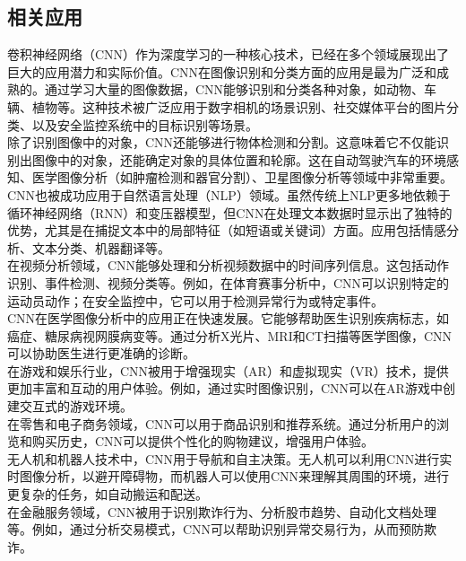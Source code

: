 \documentclass{NauThesis}
\begin{document}
\subsection{相关应用}
卷积神经网络（CNN）作为深度学习的一种核心技术，已经在多个领域展现出了巨大的应用潜力和实际价值。CNN在图像识别和分类方面的应用是最为广泛和成熟的。通过学习大量的图像数据，CNN能够识别和分类各种对象，如动物、车辆、植物等。这种技术被广泛应用于数字相机的场景识别、社交媒体平台的图片分类、以及安全监控系统中的目标识别等场景。
\\\hspace*{2em}除了识别图像中的对象，CNN还能够进行物体检测和分割。这意味着它不仅能识别出图像中的对象，还能确定对象的具体位置和轮廓。这在自动驾驶汽车的环境感知、医学图像分析（如肿瘤检测和器官分割）、卫星图像分析等领域中非常重要。
\\\hspace*{2em}CNN也被成功应用于自然语言处理（NLP）领域。虽然传统上NLP更多地依赖于循环神经网络（RNN）和变压器模型，但CNN在处理文本数据时显示出了独特的优势，尤其是在捕捉文本中的局部特征（如短语或关键词）方面。应用包括情感分析、文本分类、机器翻译等。
\\\hspace*{2em}在视频分析领域，CNN能够处理和分析视频数据中的时间序列信息。这包括动作识别、事件检测、视频分类等。例如，在体育赛事分析中，CNN可以识别特定的运动员动作；在安全监控中，它可以用于检测异常行为或特定事件。
\\\hspace*{2em}CNN在医学图像分析中的应用正在快速发展。它能够帮助医生识别疾病标志，如癌症、糖尿病视网膜病变等。通过分析X光片、MRI和CT扫描等医学图像，CNN可以协助医生进行更准确的诊断。
\\\hspace*{2em}在游戏和娱乐行业，CNN被用于增强现实（AR）和虚拟现实（VR）技术，提供更加丰富和互动的用户体验。例如，通过实时图像识别，CNN可以在AR游戏中创建交互式的游戏环境。
\\\hspace*{2em}在零售和电子商务领域，CNN可以用于商品识别和推荐系统。通过分析用户的浏览和购买历史，CNN可以提供个性化的购物建议，增强用户体验。
\\\hspace*{2em}无人机和机器人技术中，CNN用于导航和自主决策。无人机可以利用CNN进行实时图像分析，以避开障碍物，而机器人可以使用CNN来理解其周围的环境，进行更复杂的任务，如自动搬运和配送。
\\\hspace*{2em}在金融服务领域，CNN被用于识别欺诈行为、分析股市趋势、自动化文档处理等。例如，通过分析交易模式，CNN可以帮助识别异常交易行为，从而预防欺诈。
\end{document}
